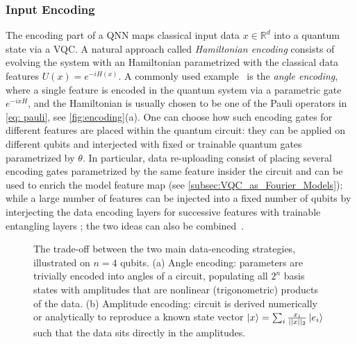 \documentclass[aps,10pt,groupedaddress,prx,superscriptaddress,twocolumn,balancelastpage, tightenlines]{revtex4-2}
\theoremstyle{plain}  %
\begin{document}
        \subsubsection{Input Encoding}\label{subsubsec:Encoding_Classical_Information}

The encoding part of a QNN maps classical input data $x \in \mathbb{R}^d$ into a quantum state via a VQC.  A natural approach called \emph{Hamiltonian encoding} consists of evolving the system with an Hamiltonian parametrized with the classical data features $U(x)=e^{- i H(x)}$. A commonly used example~\cite{Schuld2021_QML_book} is the \emph{angle encoding}, where a single feature is encoded in the quantum system via a parametric gate $e^{-i x H}$, and the  Hamiltonian is usually chosen to be one of the Pauli operators in \autoref{eq: pauli}, see \autoref{fig:encoding}(a). 
One can choose how such encoding gates for different features are placed within the quantum circuit: they can be applied on different qubits and interjected with fixed or trainable quantum gates parametrized by $\theta$. In particular, data re-uploading \cite{PerezSalinas2020datareuploading, Schuld_2021_Effect} consist of placing several encoding gates parametrized by the same feature insider the circuit and can be used to enrich the model feature map (see \autoref{subsec:VQC_as_Fourier_Models}); while a large number of features can be injected into a fixed number of qubits by interjecting the data encoding layers for successive features with trainable entangling layers \cite{sagingalieva2023hybrid, lusnig2024hybrid, sagingalieva2025photovoltaic, periyasamy2022incremental}; the two ideas can also be combined~\cite{periyasamy2023bcqq}.

\begin{figure}[!t]
    \centering
    
    \caption{The trade-off between the two main data-encoding strategies, illustrated on $n=4$ qubits. (a) Angle encoding: 
    parameters are trivially encoded into angles of a circuit, populating all $2^n$ basis states with amplitudes that are nonlinear (trigonometric) products of the data. (b) Amplitude encoding: circuit is derived numerically or analytically to reproduce a known state vector $\ket{x} = \sum_{i} \frac{x_i}{||x||_2} \ket{e_i}$ such that the data sits directly in the amplitudes.}
    \label{fig:encoding}
\end{figure}
\end{document}
